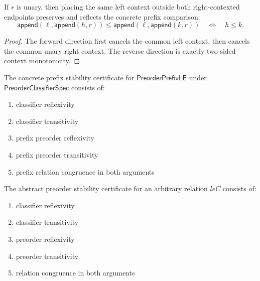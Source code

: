\begin{theorem}
\label{thm:preorder-prefix-append-both-context-iff}
If \(r\) is unary, then placing the same left context outside both
right-contexted endpoints preserves and reflects the concrete prefix
comparison:
$$
  \mathsf{append}(\ell,\mathsf{append}(h,r))\le
  \mathsf{append}(\ell,\mathsf{append}(k,r))
  \quad\Longleftrightarrow\quad
  h\le k.
$$
\end{theorem}
\begin{proof}
The forward direction first cancels the common left context, then cancels the
common unary right context. The reverse direction is exactly two-sided context
monotonicity.
\end{proof}

\begin{definition}
\label{def:preorder-prefix-stability-certificate}
The concrete prefix stability certificate for $\mathsf{PreorderPrefixLE}$ under $\mathsf{PreorderClassifierSpec}$ consists of:
\begin{enumerate}
  \item classifier reflexivity
  \item classifier transitivity
  \item prefix preorder reflexivity
  \item prefix preorder transitivity
  \item prefix relation congruence in both arguments
\end{enumerate}
\end{definition}

\begin{definition}
\label{def:preorder-stability-certificate}
The abstract preorder stability certificate for an arbitrary relation $leC$ consists of:
\begin{enumerate}
  \item classifier reflexivity
  \item classifier transitivity
  \item preorder reflexivity
  \item preorder transitivity
  \item relation congruence in both arguments
\end{enumerate}
\end{definition}

